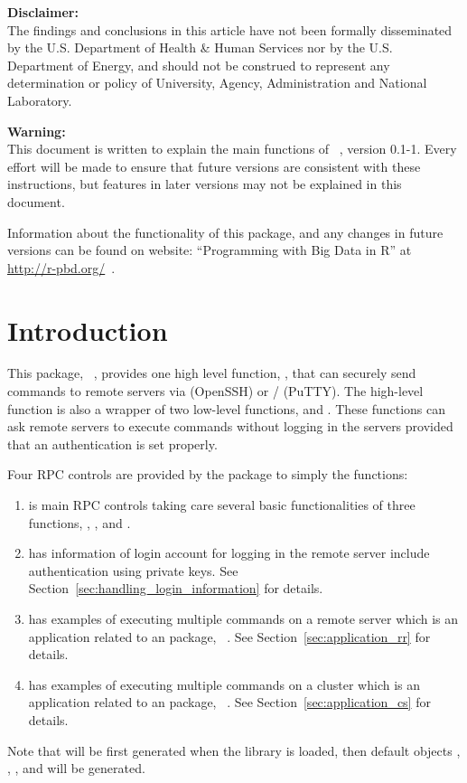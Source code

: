
{\color{red} \bf Disclaimer:}\\
The findings and conclusions in this article have not been
formally disseminated by the U.S. Department of Health \& Human Services
nor by the U.S. Department of Energy,
and should not be construed to represent any determination or
policy of University, Agency, Administration and National Laboratory.

{\color{red} \bf Warning:}\\
This document is written to explain the main
functions of ~\citep{Chen2017pbdRPCpackage}, version 0.1-1.
Every effort will be made to ensure that future versions are consistent with
these instructions, but features in later versions may not be explained
in this document.

Information about the functionality of this package,
and any changes in future versions can be found on website:
``Programming with Big Data in R'' at
\url{http://r-pbd.org/}~\citep{pbdR2012}.




\section[Introduction]{Introduction}
\label{sec:introduction}

This package, ~\citep{Chen2017pbdRPCpackage},
provides one high level function, , that can securely send
commands to remote servers via  (OpenSSH) or
/ (PuTTY).
The high-level function is also a wrapper
of two low-level functions,  and .
These functions can ask remote servers to execute commands without
logging in the servers provided that an authentication is set properly.

Four RPC controls are provided by the package to simply the functions:
\begin{enumerate}
\item {} is main RPC controls taking care several basic
      functionalities of three functions, , , and
      .
\item {} has information of login account for logging in
      the remote server include authentication using private keys.
      See Section~\ref{sec:handling_login_information} for details.
\item {} has examples of executing multiple commands
      on a remote server which is an application related
      to an  package, ~\citep{remoter}. See
      Section~\ref{sec:application_rr} for details.
\item {} has examples of executing multiple commands
      on a  cluster which is an application related
      to an  package, ~\citep{pbdCS}. See
      Section~\ref{sec:application_cs} for details.
\end{enumerate}
Note that  will be first generated when the library 
is loaded, then default objects , , ,
and  will be generated.

